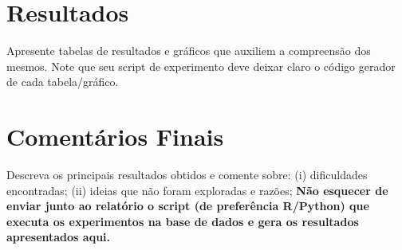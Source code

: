\documentclass{article}
\begin{document}
\section{Resultados}

Apresente tabelas de resultados e gráficos que auxiliem a compreensão dos
mesmos.
Note que seu script de experimento deve deixar claro o código gerador de cada tabela/gráfico.

\section{Comentários Finais}

Descreva os principais resultados obtidos e comente sobre:
(i) dificuldades encontradas;
(ii) ideias que não foram exploradas e razões;
\textbf{Não esquecer de enviar junto ao relatório o script (de preferência R/Python) que executa os experimentos na base de dados e gera os resultados apresentados aqui.}
\end{document}
